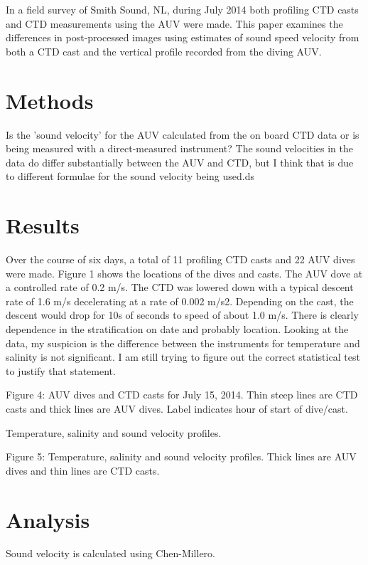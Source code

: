 \documentclass[preprint,12pt,3p]{elsarticle}
\begin{document}
In a field survey of Smith Sound, NL, during July 2014 both profiling CTD casts and CTD measurements using the AUV were made.  This paper examines the differences in post-processed images using estimates of sound speed velocity from both a CTD cast and the vertical profile recorded from the diving AUV.  

\section{Methods}

Is the 'sound velocity' for the AUV calculated from the on board CTD data or is being measured with a direct-measured instrument?  The sound velocities in the data do differ substantially between the AUV and CTD, but I think that is due to different formulae for the sound velocity being used.ds

\section{Results}


 Over the course of six days, a total of 11 profiling CTD casts and 22 AUV dives were made.  Figure 1 shows the locations of the dives and casts. The AUV dove at a controlled rate of 0.2 m/s. The CTD was lowered down with a typical descent rate of 1.6 m/s decelerating at a rate of 0.002 m/s2.  Depending on the cast, the descent would drop for 10s of seconds to speed of about 1.0 m/s.
There is clearly dependence in the stratification on date and probably location.  Looking at the data, my suspicion is the difference between the instruments for temperature and salinity is not significant. I am still trying to figure out the correct statistical test to justify that statement.  

 Figure 4: AUV dives and CTD casts for July 15, 2014. Thin steep lines are CTD casts and thick lines are AUV dives. Label indicates hour of start of dive/cast.

Temperature, salinity and sound velocity profiles.

Figure 5: Temperature, salinity and sound velocity profiles.  Thick lines are AUV dives and thin lines are CTD casts.

\section{Analysis}

Sound velocity is calculated using Chen-Millero.
\end{document}
